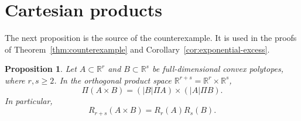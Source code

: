 \documentclass[11pt]{article}
\newtheorem{proposition}[theorem]{Proposition}
\newcommand{\R}{\mathbb R}
\begin{document}
\section{Cartesian products}\label{sec:product}

The next proposition is the source of the counterexample. It is used in the
proofs of Theorem~\ref{thm:counterexample} and
Corollary~\ref{cor:exponential-excess}.

\begin{proposition}\label{prop:product}
Let \(A\subset\R^r\) and \(B\subset\R^s\) be full-dimensional convex
polytopes, where \(r,s\ge2\). In the orthogonal product space
\(\R^{r+s}=\R^r\times\R^s\),
\begin{equation}\label{eq:product-body}
 \Pi(A\times B)=(|B|\Pi A)\times(|A|\Pi B).
\end{equation}
In particular,
\begin{equation}\label{eq:multiplicative}
 R_{r+s}(A\times B)=R_r(A)R_s(B).
\end{equation}
\end{proposition}
\end{document}
